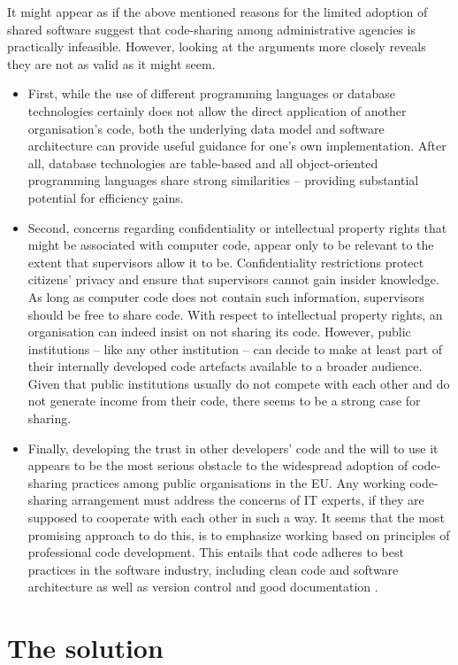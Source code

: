 \documentclass[a4paper, 11pt]{report}
\begin{document}
It might appear as if the above mentioned reasons for the limited adoption of shared software suggest that code-sharing among administrative agencies is practically infeasible. However, looking at the arguments more closely reveals they are not as valid as it might seem.
%
\begin{itemize}
	\item First, while the use of different programming languages or database technologies certainly does not allow the direct application of another organisation's code, both the underlying data model and software architecture can provide useful guidance for one's own implementation. After all, database technologies are table-based and all object-oriented programming languages share strong similarities -- providing substantial potential for efficiency gains.
	\item Second, concerns regarding confidentiality or intellectual property rights that might be associated with computer code, appear only to be relevant to the extent that supervisors allow it to be. Confidentiality restrictions protect citizens' privacy and ensure that supervisors cannot gain insider knowledge. As long as computer code does not contain such information, supervisors should be free to share code. With respect to intellectual property rights, an organisation can indeed insist on not sharing its code. However, public institutions -- like any other institution -- can decide to make at least part of their internally developed code artefacts available to a broader audience. Given that public institutions usually do not compete with each other and do not generate income from their code, there seems to be a strong case for sharing.
	\item Finally, developing the trust in other developers' code and the will to use it appears to be the most serious obstacle to the widespread adoption of code-sharing practices among public organisations in the EU. Any working code-sharing arrangement must address the concerns of IT experts, if they are supposed to cooperate with each other in such a way. It seems that the most promising approach to do this, is to emphasize working based on principles of professional code development. This entails that code adheres to best practices in the software industry, including clean code and software architecture as well as version control and good documentation \parencite{Martin.2018, Ousterhout.2021}.
\end{itemize}

\section{The solution\label{sec:intro-solution}}
\end{document}

